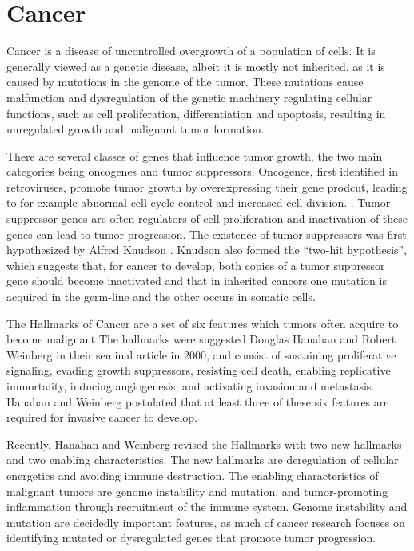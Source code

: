 
\section{Cancer}\label{cancer}

Cancer is a disease of uncontrolled overgrowth of a population of cells. It is
generally viewed as a genetic disease, albeit it is mostly not inherited, as it is
caused by  mutations in the genome of the tumor. These mutations cause malfunction
and dysregulation of the genetic machinery regulating cellular functions, such
as cell proliferation, differentiation and apoptosis, resulting in
unregulated growth and malignant tumor formation.

There are several classes of genes that influence tumor growth, the two main
categories being oncogenes and tumor suppressors. Oncogenes, first
identified in retroviruses,
promote tumor growth by overexpressing their gene prodcut, leading to for
example abnormal cell-cycle control and increased cell division.
\citep{Varmus1988}. Tumor-suppressor genes are often regulators of cell
proliferation and
inactivation of these genes can lead to tumor progression. The existence of
tumor suppressors was first hypothesized by Alfred Knudson \citep{Knudson1971}.
Knudson also formed the “two-hit hypothesis”, which
suggests that, for cancer to develop, both copies of
a tumor suppressor gene should become inactivated and that in inherited
cancers one mutation is acquired in the germ-line and the other occurs in
somatic cells.

The Hallmarks of Cancer are a set of
six features which tumors often acquire to become malignant
The hallmarks were suggested Douglas Hanahan and Robert Weinberg \citep{Hanahan2000} in
their seminal article in 2000, and consist of
sustaining proliferative signaling, evading growth suppressors, resisting cell
death, enabling replicative immortality, inducing angiogenesis, and activating
invasion and metastasis. Hanahan and Weinberg postulated that at least three
of these six features are required for invasive cancer to develop.

Recently, Hanahan and Weinberg \citep{Hanahan2011} revised the Hallmarks with two new
hallmarks and two enabling characteristics. The new
hallmarks are deregulation of cellular energetics and avoiding immune
destruction. The enabling characteristics of malignant tumors are genome
instability and mutation, and tumor-promoting inflammation through recruitment
of the immune system. Genome instability and mutation are decidedly important
features, as much of cancer research focuses on identifying mutated or
dysregulated genes that promote tumor progression.




